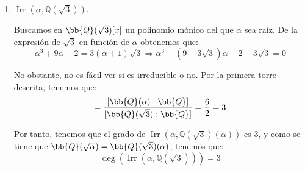 \documentclass[12pt]{article}
\DeclareMathOperator{\Irr}{Irr}
\begin{document}
\begin{ejercicio}
\begin{enumerate}
\begin{itemize}
            Por el Lema de la Torre, tenemos que:
            \begin{equation*}
                [\bb{Q}(\alpha):\bb{Q}] = [\bb{Q}(\alpha):\bb{Q}(\sqrt[3]{2})][\bb{Q}(\sqrt[3]{2}):\bb{Q}]
            \end{equation*}
            \begin{itemize}
                \item $\Irr(\sqrt[3]{2},\mathbb{Q}) = x^3-2$, que es irreducible por Eisenstein para $p=2$, luego $[\bb{Q}(\sqrt[3]{2}):\bb{Q}] = 3$.
                \item Dado $h=x^2-3\in \bb{Q}(\sqrt[3]{2})[x]$, tenemos que $h(\sqrt{3}) = 0$, luego $\Irr(\sqrt{3},\bb{Q}(\sqrt[3]{2}))$ divide a $h$, con lo que $[\bb{Q}(\alpha):\bb{Q}(\sqrt[3]{2})] \leq 2$. Notemos que no es fácil ver si es irreducible o no, por lo que a priori no podemos afirmar si es $1$ o $2$.
            \end{itemize}
        \end{itemize}

        Por tanto, tenemos que $[\bb{Q}(\alpha):\bb{Q}]$ es múltiplo de $2$ y de $3$, y menor o igual que $6$. Por tanto, $[\bb{Q}(\alpha):\bb{Q}] = 6$, y $\Irr(\alpha,\mathbb{Q})$ es de grado 6. Por tanto:
        \begin{equation*}
            \Irr(\alpha,\mathbb{Q}) = x^6 + 18x^4 - 4x^3 + 54x^2 - 90x - 23\in \bb{Q}[x]
        \end{equation*}
        \item $\Irr(\alpha,\mathbb{Q}(\sqrt{3}))$.
        
        Buscamos en $\bb{Q}(\sqrt{3})[x]$ un polinomio mónico del que $\alpha$ sea raíz. De la expresión de $\sqrt{3}$ en función de $\alpha$ obtenemos que:
        \begin{equation*}
            \alpha^3+9\alpha-2 = 3(\alpha+1)\sqrt{3} \Longrightarrow \alpha^3+(9-3\sqrt{3})\alpha-2-3\sqrt{3} = 0
        \end{equation*}

        No obstante, no es fácil ver si es irreducible o no. Por la primera torre descrita, tenemos que:
        \begin{equation*}
            [\bb{Q}(\alpha):\bb{Q}(\sqrt{3})] = \dfrac{[\bb{Q}(\alpha):\bb{Q}]}{[\bb{Q}(\sqrt{3}):\bb{Q}]} = \dfrac{6}{2} = 3
        \end{equation*}

        Por tanto, tenemos que el grado de $\Irr(\alpha,\mathbb{Q}(\sqrt{3})(\alpha))$ es 3, y como se tiene que $\bb{Q}(\sqrt{\alpha})=\bb{Q}(\sqrt{3})(\alpha)$, tenemos que:
        \begin{equation*}
            \deg(\Irr(\alpha,\mathbb{Q}(\sqrt{3}))) = 3
        \end{equation*}


\end{enumerate}
\end{ejercicio}
\end{document}
